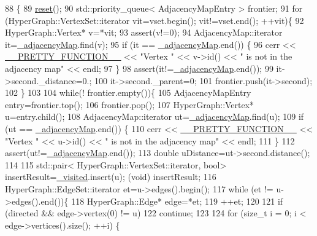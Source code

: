 \begin{DoxyCode}
88   \{
89     \hyperlink{structg2o_1_1HyperDijkstra_ad9c39fd01a0740f2beff98c927aaebbd}{reset}();
90     std::priority\_queue< AdjacencyMapEntry > frontier;
91     \textcolor{keywordflow}{for} (HyperGraph::VertexSet::iterator vit=vset.begin(); vit!=vset.end(); ++vit)\{
92       HyperGraph::Vertex* v=*vit;
93       assert(v!=0);
94       AdjacencyMap::iterator it=\hyperlink{structg2o_1_1HyperDijkstra_ae306dd26e901b88fe6c54f02a45c3e7f}{\_adjacencyMap}.find(v);
95       \textcolor{keywordflow}{if} (it == \hyperlink{structg2o_1_1HyperDijkstra_ae306dd26e901b88fe6c54f02a45c3e7f}{\_adjacencyMap}.end()) \{
96         cerr << \hyperlink{macros_8h_a9c15fe1e91b07ea3280f5239f9841b67}{\_\_PRETTY\_FUNCTION\_\_} << \textcolor{stringliteral}{"Vertex "} << v->id() << \textcolor{stringliteral}{" is not in the adjacency
       map"} << endl;
97       \}
98       assert(it!=\hyperlink{structg2o_1_1HyperDijkstra_ae306dd26e901b88fe6c54f02a45c3e7f}{\_adjacencyMap}.end());
99       it->second.\_distance=0.;
100       it->second.\_parent=0;
101       frontier.push(it->second);
102     \}
103 
104     \textcolor{keywordflow}{while}(! frontier.empty())\{
105       AdjacencyMapEntry entry=frontier.top();
106       frontier.pop();
107       HyperGraph::Vertex* u=entry.child();
108       AdjacencyMap::iterator ut=\hyperlink{structg2o_1_1HyperDijkstra_ae306dd26e901b88fe6c54f02a45c3e7f}{\_adjacencyMap}.find(u);
109       \textcolor{keywordflow}{if} (ut == \hyperlink{structg2o_1_1HyperDijkstra_ae306dd26e901b88fe6c54f02a45c3e7f}{\_adjacencyMap}.end()) \{
110         cerr << \hyperlink{macros_8h_a9c15fe1e91b07ea3280f5239f9841b67}{\_\_PRETTY\_FUNCTION\_\_} << \textcolor{stringliteral}{"Vertex "} << u->id() << \textcolor{stringliteral}{" is not in the adjacency
       map"} << endl;
111       \}
112       assert(ut!=\hyperlink{structg2o_1_1HyperDijkstra_ae306dd26e901b88fe6c54f02a45c3e7f}{\_adjacencyMap}.end());
113       \textcolor{keywordtype}{double} uDistance=ut->second.distance();
114 
115       std::pair< HyperGraph::VertexSet::iterator, bool> insertResult=\hyperlink{structg2o_1_1HyperDijkstra_ad43cae6d9e1df2cf7db839f504ba6cc5}{\_visited}.insert(u); (void) 
      insertResult;
116       HyperGraph::EdgeSet::iterator et=u->edges().begin();
117       \textcolor{keywordflow}{while} (et != u->edges().end())\{
118         HyperGraph::Edge* edge=*et;
119         ++et;
120 
121         \textcolor{keywordflow}{if} (directed && edge->vertex(0) != u)
122           \textcolor{keywordflow}{continue};
123 
124         \textcolor{keywordflow}{for} (\textcolor{keywordtype}{size\_t} i = 0; i < edge->vertices().size(); ++i) \{

\end{DoxyCode}
